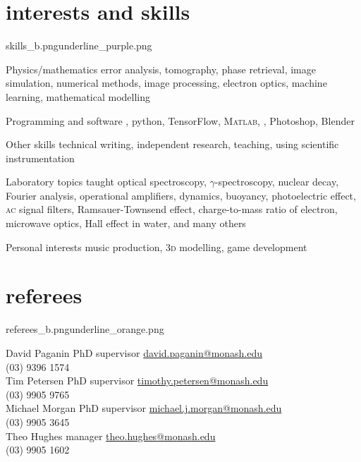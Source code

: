 \documentclass[a4paper]{friggeri-cv} %
\newcommand{\spacer}{\vspace{0.0cm}}
\begin{document}

\spacer
\section{interests and skills}{skills_b.png}{underline_purple.png}
\begin{entrylist}


\entry
{}
{Physics/mathematics}
{}
{error analysis, tomography, phase retrieval, image simulation, numerical methods, image processing, electron optics, machine learning, mathematical modelling\\}

\entry
{}
{Programming and software}
{}
{\cpp, {\selectfont\color{lightgray2}\pythonfont python}, TensorFlow, \textsc{Matlab}, {\latex}, Photoshop, Blender\\}

\entry
{}
{Other skills}
{}
{technical writing, independent research, teaching, using scientific instrumentation\\}

\entry
{}
{Laboratory topics taught}
{}
{optical spectroscopy, $\gamma$-spectroscopy, nuclear decay, Fourier analysis, operational amplifiers, dynamics, buoyancy, photoelectric effect, \textsc{ac} signal filters, Ramsauer-Townsend effect, charge-to-mass ratio of electron, microwave optics, Hall effect in water, and many others\\}

\entry
{}
{Personal interests}
{}
{music production, \textsc{3d} modelling, game development}


\end{entrylist}

\spacer
\section{referees}{referees_b.png}{underline_orange.png}

\begin{entrylist}
\entry
{}
{\prof{} David Paganin}
{PhD supervisor}
{\href{mailto:david.paganin@monash.edu}{david.paganin@monash.edu}\\
(03) 9396 1574\\}
\entry
{}
{\dr{} Tim Petersen}
{PhD supervisor}
{\href{mailto:timothy.petersen@monash.edu}{timothy.petersen@monash.edu}\\
(03) 9905 9765 \\}
\entry
{}
{\prof{} Michael Morgan}
{PhD supervisor}
{\href{mailto:michael.j.morgan@monash.edu}{michael.j.morgan@monash.edu}\\
(03) 9905 3645\\}
\entry
{}
{Theo Hughes}
{manager}
{\href{mailto:theo.hughes@monash.edu}{theo.hughes@monash.edu} \\
(03) 9905 1602}
\end{entrylist}
\end{document}
